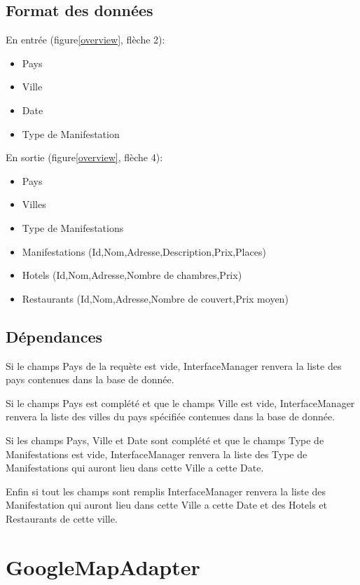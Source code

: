 		\subsection{Format des données}
		
			En entrée (figure\ref{overview}, flèche 2):
			\begin{itemize}
			  \item Pays
			  \item Ville
			  \item Date
			  \item Type de Manifestation\\
			\end{itemize}
			
			En sortie (figure\ref{overview}, flèche 4):
			\begin{itemize}
			  \item Pays
			  \item Villes
			  \item Type de Manifestations
			  \item Manifestations (Id,Nom,Adresse,Description,Prix,Places)
			  \item Hotels (Id,Nom,Adresse,Nombre de chambres,Prix)
			  \item Restaurants (Id,Nom,Adresse,Nombre de couvert,Prix moyen)
			\end{itemize}
		
		\subsection{Dépendances}
		
			Si le champs Pays de la requète est vide, InterfaceManager
			renvera la liste des pays contenues dans la base de donnée.
			
			Si le champs Pays est complété et que le champs Ville est vide,
			InterfaceManager renvera la liste des villes du pays spécifiée contenues dans
			la base de donnée.
		
			Si les champs Pays, Ville et Date sont complété et que le champs Type de
			Manifestations est vide, InterfaceManager renvera la liste des Type de
			Manifestations qui auront lieu dans cette Ville a cette Date.
			
			Enfin si tout les champs sont remplis InterfaceManager renvera la liste des
			Manifestation qui auront lieu dans cette Ville a cette Date et des Hotels et
			Restaurants de cette ville.
		
	\section{GoogleMapAdapter}	
		
